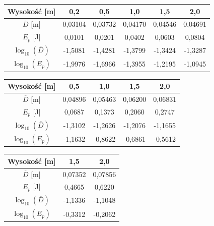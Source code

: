 \documentclass[a4paper,12pt]{article}
\begin{document}
\begin{center}
    \begin{tabular}{|c|c|c|c|c|c|}
        \hline
        Wysokość [m] & 0,2 & 0,5 & 1,0 & 1,5 & 2,0 \\
        \hline
        $\overline{D}$ [m] & 0,03104 & 0,03732 & 0,04170 & 0,04546 & 0,04691 \\
        \hline
        $E_p$ [J] & 0,0101 & 0,0201 & 0,0402 & 0,0603 & 0,0804 \\
        \hline
        $\log_{10}(\overline{D})$ & -1,5081 & -1,4281 & -1,3799 & -1,3424 & -1,3287 \\
        \hline
        $\log_{10}(E_p)$ & -1,9976 & -1,6966 & -1,3955 & -1,2195 & -1,0945 \\
        \hline
    \end{tabular}
    \label{tab:wyniki_mala}
\end{center}

\begin{center}
    \begin{tabular}{|c|c|c|c|c|}
        \hline
        Wysokość [m] & 0,5 & 1,0 & 1,5 & 2,0 \\
        \hline
        $\overline{D}$ [m] & 0,04896 & 0,05463 & 0,06200 & 0,06831 \\
        \hline
        $E_p$ [J] & 0,0687 & 0,1373 & 0,2060 & 0,2747 \\
        \hline
        $\log_{10}(\overline{D})$ & -1,3102 & -1,2626 & -1,2076 & -1,1655 \\
        \hline
        $\log_{10}(E_p)$ & -1,1632 & -0,8622 & -0,6861 & -0,5612 \\
        \hline
    \end{tabular}
    \label{tab:wyniki_srednia}
\end{center}

\begin{center}
    \begin{tabular}{|c|c|c|}
        \hline
        Wysokość [m] & 1,5 & 2,0 \\
        \hline
        $\overline{D}$ [m] & 0,07352 & 0,07856 \\
        \hline
        $E_p$ [J] & 0,4665 & 0,6220 \\
        \hline
        $\log_{10}(\overline{D})$ & -1,1336 & -1,1048 \\
        \hline
        $\log_{10}(E_p)$ & -0,3312 & -0,2062 \\
        \hline
    \end{tabular}
    \label{tab:wyniki_duza}
\end{center}
\end{document}
